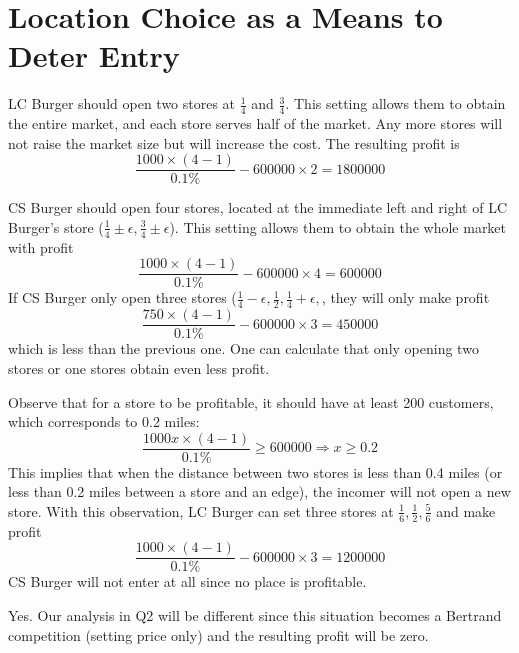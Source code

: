 \documentclass[a4paper]{article}
\begin{document}
    \section{Location Choice as a Means to Deter Entry}
    \begin{answer}[Q1]
    LC Burger should open two stores at $\frac{1}{4}$ and $\frac{3}{4}$. This setting allows them to obtain the entire market, and each store serves half of the market. Any more stores will not raise the market size but will increase the cost. The resulting profit is
    \[
        \frac{1000\times(4-1)}{0.1\%}-600000\times2 = 1800000
    \]
    \end{answer}
    
    \begin{answer}[Q2]
    CS Burger should open four stores, located at the immediate left and right of LC Burger's store ($\frac{1}{4}\pm\epsilon,\frac{3}{4}\pm\epsilon$). This setting allows them to obtain the whole market with profit
    \[
        \frac{1000\times(4-1)}{0.1\%} - 600000\times 4 = 600000
    \]
    If CS Burger only open three stores ($\frac{1}{4}-\epsilon,\frac{1}{2},\frac{1}{4}+\epsilon,$, they will only make profit
    \[
        \frac{750\times(4-1)}{0.1\%} - 600000\times 3 = 450000
    \]
    which is less than the previous one. One can calculate that only opening two stores or one stores obtain even less profit.
    \end{answer}
    
    \begin{answer}[Q3]
    Observe that for a store to be profitable, it should have at least 200 customers, which corresponds to 0.2 miles:
    \[
        \frac{1000x\times (4-1)}{0.1\%}\ge 600000 \Rightarrow x \ge 0.2
    \]
    This implies that when the distance between two stores is less than 0.4 miles (or less than 0.2 miles between a store and an edge), the incomer will not open a new store. With this observation, LC Burger can set three stores at $\frac{1}{6}, \frac{1}{2}, \frac{5}{6}$ and make profit
    \[
        \frac{1000\times(4-1)}{0.1\%} - 600000\times 3 = 1200000
    \]
    CS Burger will not enter at all since no place is profitable.
    \end{answer}
    
    \begin{answer}[Q4]
    Yes. Our analysis in Q2 will be different since this situation becomes a Bertrand competition (setting price only) and the resulting profit will be zero.
    \end{answer}
    
\end{document}
